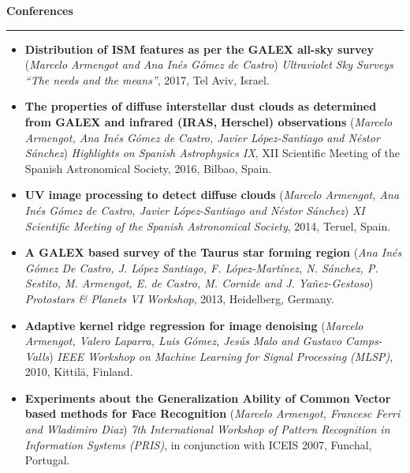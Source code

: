 \documentclass[10pt,a4paper]{article}
\newcommand{\sect}[1]{\vspace{6pt}\noindent\textbf{\large #1}\vspace{2pt}\hrule\vspace{6pt}}
\begin{document}
\sect{Conferences}
\begin{itemize}[leftmargin=*]
    \item \textbf{Distribution of ISM features as per the GALEX all-sky survey} (\textit{Marcelo Armengot and Ana Inés Gómez de Castro}) \textit{Ultraviolet Sky Surveys “The needs and the means”}, 2017, Tel Aviv, Israel.

    \item \textbf{The properties of diffuse interstellar dust clouds as determined from GALEX and infrared (IRAS, Herschel) observations} (\textit{Marcelo Armengot, Ana Inés Gómez de Castro, Javier López-Santiago and Néstor Sánchez}) \textit{Highlights on Spanish Astrophysics IX}, XII Scientific Meeting of the Spanish Astronomical Society, 2016, Bilbao, Spain.

    \item \textbf{UV image processing to detect diffuse clouds} (\textit{Marcelo Armengot, Ana Inés Gómez de Castro, Javier López-Santiago and Néstor Sánchez}) \textit{XI Scientific Meeting of the Spanish Astronomical Society}, 2014, Teruel, Spain.

    \item \textbf{A GALEX based survey of the Taurus star forming region} (\textit{Ana Inés Gómez De Castro, J. López Santiago, F. López-Martínez, N. Sánchez, P. Sestito, M. Armengot, E. de Castro, M. Cornide and J. Yañez-Gestoso}) \textit{Protostars \& Planets VI Workshop}, 2013, Heidelberg, Germany.

    \item \textbf{Adaptive kernel ridge regression for image denoising} (\textit{Marcelo Armengot, Valero Laparra, Luis Gómez, Jesús Malo and Gustavo Camps-Valls}) \textit{IEEE Workshop on Machine Learning for Signal Processing (MLSP)}, 2010, Kittilä, Finland.

    \item \textbf{Experiments about the Generalization Ability of Common Vector based methods for Face Recognition} (\textit{Marcelo Armengot, Francesc Ferri and Wladimiro Diaz}) \textit{7th International Workshop of Pattern Recognition in Information Systems (PRIS)}, in conjunction with ICEIS 2007, Funchal, Portugal.
\end{itemize}


\newpage
\end{document}
